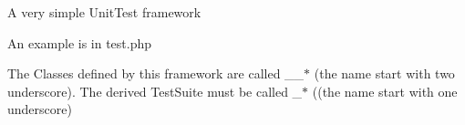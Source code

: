 A very simple Unit\-Test framework

An example is in test.php

The Classes defined by this framework are called \_\-\_\-$\ast$ (the name start with two underscore). The derived Test\-Suite must be called \_\-$\ast$ ((the name start with one underscore) 